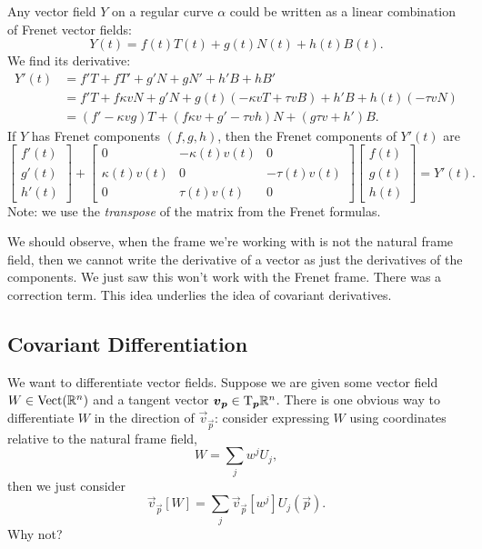 \M
Any vector field $Y$ on a regular curve $\alpha$ could be written as a
linear combination of Frenet vector fields:
\begin{equation}
Y(t) = f(t)T(t) + g(t)N(t) + h(t)B(t).
\end{equation}
We find its derivative:
\begin{subequations}
\begin{align}
  Y'(t) &= f'T + fT' + g'N + gN' + h'B + hB'\\
  &= f'T + f\kappa vN + g'N + g(t)(-\kappa vT + \tau v B) + h'B +
  h(t)(-\tau vN)\\
  &= (f' - \kappa v g)T + (f\kappa v + g' - \tau v h)N + (g\tau v + h')B.
\end{align}
\end{subequations}
If $Y$ has Frenet components $(f,g,h)$, then the Frenet components of
$Y'(t)$ are
\begin{equation}
\begin{bmatrix}f'(t)\\g'(t)\\h'(t)
\end{bmatrix}
+
\begin{bmatrix}0 & -\kappa(t)v(t) & 0\\
\kappa(t)v(t) & 0 & -\tau(t)v(t)\\
0 & \tau(t)v(t) & 0
\end{bmatrix}
\begin{bmatrix}f(t)\\ g(t)\\ h(t)
\end{bmatrix} = Y'(t).
\end{equation}
Note: we use the \emph{transpose} of the matrix from the Frenet
formulas.

\begin{remark}
We should observe, when the frame we're working with is not the natural
frame field, then we cannot write the derivative of a vector as just the
derivatives of the components. We just saw this won't work with the
Frenet frame. There was a correction term. This idea underlies the idea
of covariant derivatives.
\end{remark}

\subsection{Covariant Differentiation}

\M
We want to differentiate vector fields. Suppose we are given some vector
field $W\in\operatorname{Vect}(\mathbb{R}^{n})$ and a tangent vector
$\boldsymbol{v}_{\boldsymbol{p}}\in\mathrm{T}_{\boldsymbol{p}}\mathbb{R}^{n}$. There is one obvious way to
differentiate $W$ in the direction of $\vec{v}_{\vec{p}}$: consider
expressing $W$ using coordinates relative to the natural frame field,
\begin{equation}
W = \sum_{j}w^{j}U_{j},
\end{equation}
then we just consider
\begin{equation}
\vec{v}_{\vec{p}}[W] = \sum_{j}\vec{v}_{\vec{p}}[w^{j}]U_{j}(\vec{p}).
\end{equation}
Why not?

